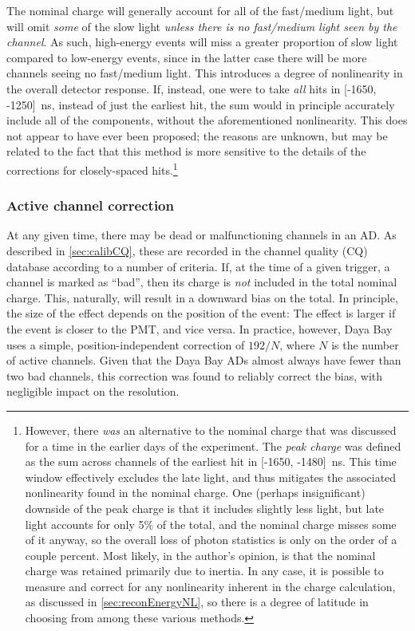 \documentclass[../thesis.tex]{subfiles}
\begin{document}
The nominal charge will generally account for all of the fast/medium light, but will omit \emph{some} of the slow light \emph{unless there is no fast/medium light seen by the channel}. As such, high-energy events will miss a greater proportion of slow light compared to low-energy events, since in the latter case there will be more channels seeing no fast/medium light. This introduces a degree of nonlinearity in the overall detector response. If, instead, one were to take \emph{all} hits in [-1650, -1250]~ns, instead of just the earliest hit, the sum would in principle accurately include all of the components, without the aforementioned nonlinearity. This does not appear to have ever been proposed; the reasons are unknown, but may be related to the fact that this method is more sensitive to the details of the corrections for closely-spaced hits.\footnote{%
However, there \emph{was} an alternative to the nominal charge that was discussed for a time in the earlier days of the experiment. The \emph{peak charge} was defined as the sum across channels of the earliest hit in [-1650, -1480]~ns. This time window effectively excludes the late light, and thus mitigates the associated nonlinearity found in the nominal charge. One (perhaps insignificant) downside of the peak charge is that it includes slightly less light, but late light accounts for only 5\% of the total, and the nominal charge misses some of it anyway, so the overall loss of photon statistics is only on the order of a couple percent. Most likely, in the author's opinion, is that the nominal charge was retained primarily due to inertia. In any case, it is possible to measure and correct for any nonlinearity inherent in the charge calculation, as discussed in \autoref{sec:reconEnergyNL}, so there is a degree of latitude in choosing from among these various methods.%
}


\subsubsection{Active channel correction}
\label{sec:reconActiveChan}

At any given time, there may be dead or malfunctioning channels in an AD. As described in \autoref{sec:calibCQ}, these are recorded in the channel quality (CQ) database according to a number of criteria. If, at the time of a given trigger, a channel is marked as ``bad'', then its charge is \emph{not} included in the total nominal charge. This, naturally, will result in a downward bias on the total. In principle, the size of the effect depends on the position of the event: The effect is larger if the event is closer to the PMT, and vice versa. In practice, however, Daya Bay uses a simple, position-independent correction of $192/N$, where $N$ is the number of active channels. Given that the Daya Bay ADs almost always have fewer than two bad channels, this correction was found to reliably correct the bias, with negligible impact on the resolution.
\end{document}
